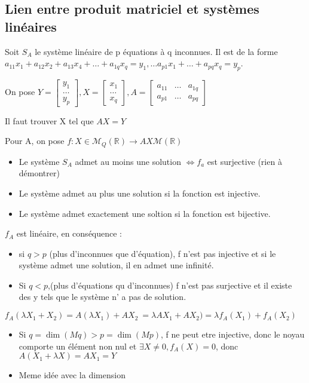 \documentclass[french]{yLectureNote}
\newcommand{\R}[0]{\mathbb{R}}
\newcommand{\mc}{\mathcal}
\begin{document}
\subsection{Lien entre produit matriciel et systèmes linéaires}
Soit \(S_A\) le système linéaire de p équations à q inconnues. Il est de la forme \(a_{11}x_1+a_{12}x_2 + a_{13}x_4+\dots+a_{1q}x_q = y_1, \dots a_{p1}x_1 + \dots + a_{pq}x_q  = y_p\).

On pose \(Y = \begin{bmatrix}
 y_1 \\
 \dots\\
 y_p
\end{bmatrix}, X = \begin{bmatrix}
 x_1 \\
 \dots\\
 x_q
\end{bmatrix}, A = \begin{bmatrix}
 a_{11}&\dots&a_{1q} \\
a_{p1}&\dots&a_{pq}
\end{bmatrix}\)

Il faut trouver X tel que \(AX=Y\)
\begin{definition}
Pour A, on pose \(f:X\in \mc{M}_Q(\R)\to AX\mc{M}(\R)\)
\end{definition}
\begin{proposition}
\begin{itemize}
 \item Le système \(S_A\) admet au moins une solution \(\iff f_a\) est surjective (rien à démontrer)
 \item Le système admet au plus une solution si la fonction est injective.
 \item Le système admet exactement une soltion si la fonction est bijective.
\end{itemize}
\end{proposition}
\begin{proposition}
\(f_A\) est linéaire, en conséquence :
\begin{itemize}
 \item si \(q>p\) (plus d'inconnues que d'équation), f n'est pas injective et si le système admet une solution, il en admet une infinité.
 \item Si \(q<p\),(plus d'équations qu d'inconnues) f n'est pas surjective et il existe des y tels que le système n' a pas de solution.
\end{itemize}
\end{proposition}
\begin{myproof}
\(f_A(\lambda X_1+X_2) = A(\lambda X_1)+AX_2\ = \lambda AX_1+AX_2) = \lambda f_A(X_1)+f_A(X_2)\)

\begin{itemize}
 \item Si \(q = \dim(Mq)>p=\dim(Mp)\), f ne peut etre injective, donc le noyau comporte un élément non nul et \(\exists X\neq 0, f_A(X) = 0\), donc \(A(X_1+\lambda X) = AX_1 = Y\)
 \item Meme idée avec la dimension
\end{itemize}
\end{myproof}
\end{document}
